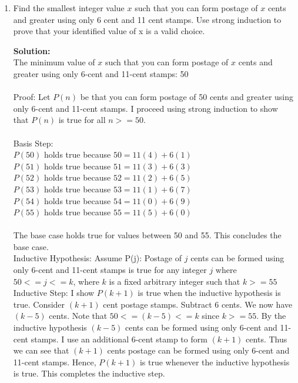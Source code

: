 \documentclass{article}
\newenvironment{solution}
{
\par
\color{blue}
\textbf{Solution:}
}
{
\par
}
\begin{document}
\begin{enumerate}
\begin{solution}
Thus, we see that $P(k + 1)$ is true under the assumption that the inductive hypothesis is true. This completes the inductive step.

By strong induction $P(n)$ holds true for all integers $n \geq 1$. $\square$
\end{solution}


\item Find the smallest integer value $x$ such that you can form postage of $x$ cents and greater using only 6 cent and 11 cent stamps. Use strong induction to prove that your identified value of x is a valid choice.

\begin{solution} \\
The minimum value of $x$ such that you can form postage of $x$ cents and greater using only 6-cent and 11-cent stamps: 50 \\\\
Proof: Let $P(n)$ be that you can form postage of 50 cents and greater using only 6-cent and 11-cent stamps. I proceed using strong induction to show that $P(n)$ is true for all $n >= 50$. \\ \\
Basis Step: \\
$P(50)$ holds true because $50 = 11(4) + 6(1)$ \\
$P(51)$ holds true because $51 = 11(3) + 6(3)$ \\ 
$P(52)$ holds true because $52 = 11(2) + 6(5)$ \\
$P(53)$ holds true because $53 = 11(1) + 6(7)$ \\
$P(54)$ holds true because $54 = 11(0) + 6(9)$ \\
$P(55)$ holds true because $55 = 11(5) + 6(0)$ \\ \\
The base case holds true for values between 50 and 55. This concludes the base case. \\

Inductive Hypothesis: Assume P(j): Postage of $j$ cents can be formed using only 6-cent and 11-cent stamps is true for any integer $j$ where $50 <= j <= k$, where $k$ is a fixed arbitrary integer such that $k >= 55$ \\  

Inductive Step: I show $P(k+1)$ is true when the inductive hypothesis is true. Consider $(k+1)$ cent postage stamps. Subtract 6 cents. We now have $(k-5)$ cents. Note that $50 <= (k-5) <= k$ since $k >= 55$. By the inductive hypothesis $(k-5)$ cents can be formed using only 6-cent and 11-cent stamps. I use an additional 6-cent stamp to form $(k+1)$ cents. Thus we can see that $(k+1)$ cents postage can be formed using only 6-cent and 11-cent stamps. Hence, $P(k+1)$ is true whenever the inductive hypothesis is true. This completes the inductive step. \\ 


\end{solution}
\end{enumerate}
\end{document}
